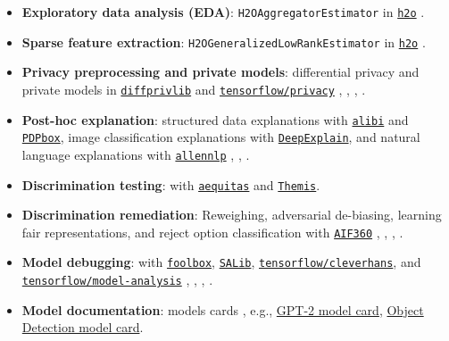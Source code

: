 \documentclass[information,article,submit,moreauthors,pdftex]{definitions/mdpi}
\begin{document}
\begin{itemize}[leftmargin=*,labelsep=5.8mm]

\item \textbf{Exploratory data analysis (EDA)}: \texttt{H2OAggregatorEstimator} in \href{http://docs.h2o.ai/h2o/latest-stable/h2o-py/docs/modeling.html#h2oaggregatorestimator}{\texttt{h2o}} \cite{wilkinson2018visualizing}.

\item \textbf{Sparse feature extraction}: \texttt{H2OGeneralizedLowRankEstimator} in \href{http://docs.h2o.ai/h2o/latest-stable/h2o-py/docs/modeling.html#h2ogeneralizedlowrankestimator}{\texttt{h2o}} \cite{udell2016generalized}.

\item \textbf{Privacy preprocessing and private models}: differential privacy and private models in \href{https://github.com/IBM/differential-privacy-library}{\texttt{diffprivlib}} and \href{https://github.com/tensorflow/privacy/}{\texttt{tensorflow/privacy}} \cite{diffprivlib}, \cite{ji2014differential}, \cite{pate}, \cite{abadi2016deep}.

\item \textbf{Post-hoc explanation}: structured data explanations with \href{https://github.com/SeldonIO/alibi}{\texttt{alibi}} and \href{https://github.com/SauceCat/PDPbox}{\texttt{PDPbox}}, image classification explanations with \href{https://github.com/marcoancona/DeepExplain}{\texttt{DeepExplain}}, and natural language explanations with \href{https://github.com/allenai/allennlp}{\texttt{allennlp}} \cite{wachter2017counterfactual}, \cite{grad_attr}, \cite{wallace2019allennlp}. 

\item \textbf{Discrimination testing}: with \href{https://github.com/dssg/aequitas}{\texttt{aequitas}} and \href{https://github.com/LASER-UMASS/Themis}{\texttt{Themis}}.

\item \textbf{Discrimination remediation}: Reweighing, adversarial de-biasing, learning fair representations, and reject option classification with \href{http://aif360.mybluemix.net/}{\texttt{AIF360}} \cite{kamiran2012data}, \cite{zhang2018mitigating}, \cite{lfr}, \cite{kamiran2012decision}.

\item \textbf{Model debugging}: with \href{https://github.com/bethgelab/foolbox}{\texttt{foolbox}}, \href{https://github.com/SALib/SALib}{\texttt{SALib}}, \href{https://github.com/tensorflow/cleverhans}{\texttt{tensorflow/cleverhans}}, and \href{https://github.com/tensorflow/model-analysis}{\texttt{tensorflow/model-analysis}} \cite{rauber2017foolbox}, \cite{papernot2018cleverhans}, \cite{modeltracker}, \cite{papernot2018marauder}.

\item \textbf{Model documentation}: models cards \cite{model_cards}, e.g.,  \href{https://github.com/openai/gpt-2/blob/master/model_card.md}{GPT-2 model card}, \href{https://modelcards.withgoogle.com/object-detection}{Object Detection model card}. 

\end{itemize}
\end{document}
